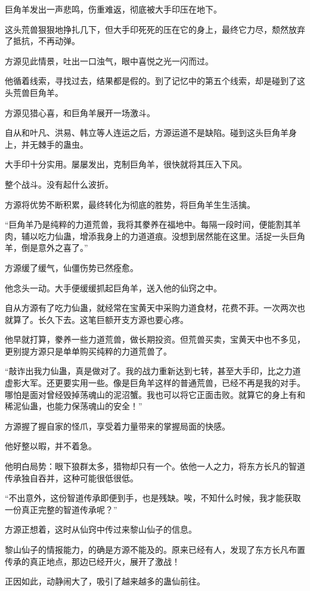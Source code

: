 \begin{this_body}
巨角羊发出一声悲鸣，伤重难返，彻底被大手印压在地下。

这头荒兽狠狠地挣扎几下，但大手印死死的压在它的身上，最终它力尽，颓然放弃了抵抗，不再动弹。

方源见此情景，吐出一口浊气，眼中喜悦之光一闪而过。

他循着线索，寻找过去，结果都是假的。到了记忆中的第五个线索，却是碰到了这头荒兽巨角羊。

方源见猎心喜，和巨角羊展开一场激斗。

自从和叶凡、洪易、韩立等人连运之后，方源运道不是缺陷。碰到这头巨角羊身上，并无棘手的蛊虫。

大手印十分实用。屡屡发出，克制巨角羊，很快就将其压入下风。

整个战斗。没有起什么波折。

方源将优势不断积累，最终转化为彻底的胜势，将巨角羊生生活擒。

“巨角羊乃是纯粹的力道荒兽，我将其豢养在福地中。每隔一段时间，便能割其羊肉，辅以吃力仙蛊，增添我身上的力道道痕。没想到居然能在这里。活捉一头巨角羊，倒是意外之喜了。”

方源缓了缓气，仙僵伤势已然痊愈。

他念头一动。大手便缓缓抓起巨角羊，送入他的仙窍之中。

自从方源有了吃力仙蛊，就经常在宝黄天中采购力道食材，花费不菲。一次两次也就算了。长久下去。这笔巨额开支方源也要心疼。

他早就打算，豢养一些力道荒兽，做长期投资。但荒兽买卖，宝黄天中也不多见，更别提方源只是单单购买纯粹的力道荒兽了。

“敲诈出我力仙蛊，真是做对了。我的战力重新达到七转，甚至大手印，比之力道虚影大军。还更要实用一些。像是巨角羊这样的普通荒兽，已经不再是我的对手。哪怕是面对曾经毁掉荡魂山的泥沼蟹。我也可以将它正面击败。就算它的身上有和稀泥仙蛊，也能力保荡魂山的安全！”

方源握了握自家的怪爪，享受着力量带来的掌握局面的快感。

他好整以暇，并不着急。

他明白局势：眼下狼群太多，猎物却只有一个。依他一人之力，将东方长凡的智道传承独自吞并，这种可能很低很低。

“不出意外，这份智道传承即便到手，也是残缺。唉，不知什么时候，我才能获取一份真正完整的智道传承呢？”

方源正想着，这时从仙窍中传过来黎山仙子的信息。

黎山仙子的情报能力，的确是方源不能及的。原来已经有人，发现了东方长凡布置传承的真正地点，那边已经开火，展开了激战！

正因如此，动静闹大了，吸引了越来越多的蛊仙前往。


\end{this_body}
